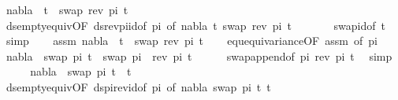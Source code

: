 \begin{isabellebody}
\ {\isachardoublequoteopen}nabla\ {\isasymturnstile}\ t{}\ {\isasymapprox}\ swap\ {\isacharparenleft}{\kern0pt}rev\ pi{\isacharparenright}{\kern0pt}\ t{}{\isachardoublequoteclose}\isanewline
\ \ \ \ \isamarkupfalse%
\ ds{\isacharunderscore}{\kern0pt}empty{\isacharunderscore}{\kern0pt}equiv{\isacharunderscore}{\kern0pt}{}{\isacharbrackleft}{\kern0pt}OF\ ds{\isacharunderscore}{\kern0pt}rev{\isacharunderscore}{\kern0pt}pi{\isacharunderscore}{\kern0pt}id{\isacharbrackleft}{\kern0pt}of\ pi{\isacharbrackright}{\kern0pt}{\isacharcomma}{\kern0pt}\ of\ nabla\ t{}\ {\isacartoucheopen}swap\ {\isacharparenleft}{\kern0pt}rev\ pi{\isacharparenright}{\kern0pt}\ t{}{\isacartoucheclose}{\isacharbrackright}{\kern0pt}\ \isanewline
\ \ \ \ \ \ swap{\isacharunderscore}{\kern0pt}id{\isacharbrackleft}{\kern0pt}of\ t{}{\isacharbrackright}{\kern0pt}\ \isamarkupfalse%
\ simp\isacommand{{\isacharbraceright}{\kern0pt}}\isamarkupfalse%
\isanewline
\isanewline
\ \ \isacommand{{\isacharbraceleft}{\kern0pt}}\isamarkupfalse%
\isamarkupfalse%
\ assm{}{\isacharcolon}{\kern0pt}\ {\isachardoublequoteopen}nabla\ {\isasymturnstile}\ t{}\ {\isasymapprox}\ swap\ {\isacharparenleft}{\kern0pt}rev\ pi{\isacharparenright}{\kern0pt}\ t{}{\isachardoublequoteclose}\isanewline
\ \ \isamarkupfalse%
\ equ{\isacharunderscore}{\kern0pt}equivariance{\isacharbrackleft}{\kern0pt}OF\ assm{}{\isacharcomma}{\kern0pt}\ of\ pi{\isacharbrackright}{\kern0pt}\isanewline
\ \ \isamarkupfalse%
\ {\isachardoublequoteopen}nabla\ {\isasymturnstile}\ swap\ pi\ t{}\ {\isasymapprox}\ swap\ {\isacharparenleft}{\kern0pt}pi\ {\isacharat}{\kern0pt}\ rev\ pi{\isacharparenright}{\kern0pt}\ t{}{\isachardoublequoteclose}\isanewline
\ \ \ \ \isamarkupfalse%
\ swap{\isacharunderscore}{\kern0pt}append{\isacharbrackleft}{\kern0pt}of\ pi\ {\isacartoucheopen}rev\ pi{\isacartoucheclose}\ t{}{\isacharbrackright}{\kern0pt}\ \isamarkupfalse%
\ simp\isanewline
\ \ \isamarkupfalse%
\ \isamarkupfalse%
\ {\isachardoublequoteopen}nabla\ {\isasymturnstile}\ swap\ pi\ t{}\ {\isasymapprox}\ t{}{\isachardoublequoteclose}\isanewline
\ \ \ \ \isamarkupfalse%
\ ds{\isacharunderscore}{\kern0pt}empty{\isacharunderscore}{\kern0pt}equiv{\isacharunderscore}{\kern0pt}{}{\isacharbrackleft}{\kern0pt}OF\ ds{\isacharunderscore}{\kern0pt}pi{\isacharunderscore}{\kern0pt}rev{\isacharunderscore}{\kern0pt}id{\isacharbrackleft}{\kern0pt}of\ pi{\isacharbrackright}{\kern0pt}{\isacharcomma}{\kern0pt}\ of\ nabla\ {\isacartoucheopen}swap\ pi\ t{}{\isacartoucheclose}\ t{}{\isacharbrackright}{\kern0pt}\ \isanewline

\end{isabellebody}
